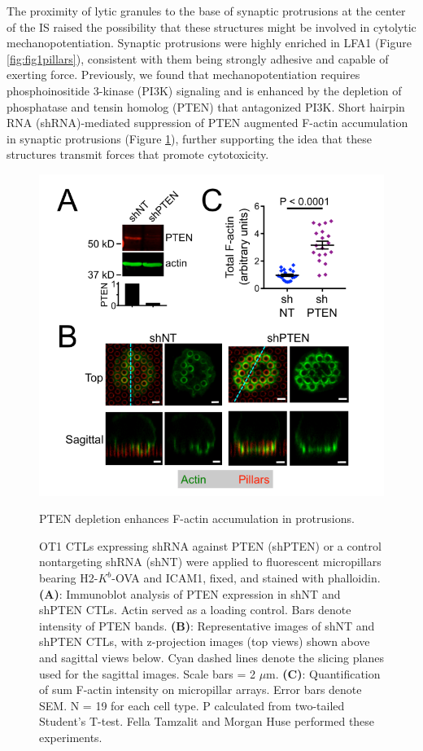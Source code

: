 The proximity of lytic granules to the base of synaptic protrusions at the center of the IS raised the possibility that these structures might be involved in cytolytic mechanopotentiation. Synaptic protrusions were highly enriched in LFA1 (Figure \ref{fig:fig1pillars}), consistent with them being strongly adhesive and capable of exerting force. Previously, we found that mechanopotentiation requires phosphoinositide 3-kinase (PI3K) signaling and is enhanced by the depletion of phosphatase and tensin homolog (PTEN) that antagonized PI3K. Short hairpin RNA (shRNA)-mediated suppression of PTEN augmented F-actin accumulation in synaptic protrusions (Figure \ref{fig:fig1ptenprotrusions}), further supporting the idea that these structures transmit forces that promote cytotoxicity.

\begin{figure}[htbp]
	\centering
	\includegraphics[width=\textwidth]{../figures/chapter2/fig1ptenprotrusions.png}
	\caption{PTEN depletion enhances F-actin accumulation in protrusions.}
	\caption*{OT1 CTLs expressing shRNA against PTEN (shPTEN) or a control nontargeting shRNA (shNT) were applied to fluorescent micropillars bearing H2-$K^{b}$-OVA and ICAM1, fixed, and stained with phalloidin. \textbf{(A)}: Immunoblot analysis of PTEN expression in shNT and shPTEN CTLs. Actin served as a loading control. Bars denote intensity of PTEN bands. \textbf{(B)}: Representative images of shNT and shPTEN CTLs, with z-projection images (top views) shown above and sagittal views below. Cyan dashed lines denote the slicing planes used for the sagittal images. Scale bars = 2 $\mu$m. \textbf{(C)}: Quantification of sum F-actin intensity on micropillar arrays. Error bars denote SEM. N = 19 for each cell type. P calculated from two-tailed Student’s T-test. Fella Tamzalit and Morgan Huse performed these experiments.}
	\label{fig:fig1ptenprotrusions}
\end{figure}

